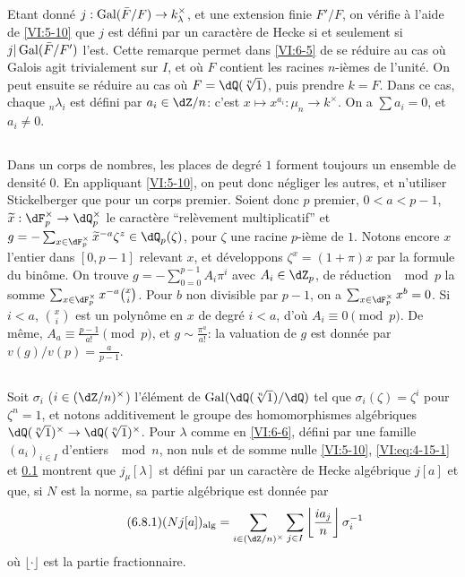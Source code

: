 Etant donné $j:\operatorname{Gal}(\bar F/F) \to k_\lambda^\times$, et une extension finie 
$F'/F$, on vérifie à l'aide de \ref{VI:5-10} que $j$ est défini par un 
caractère de Hecke si et seulement si $j|\operatorname{Gal}(\bar F/F')$ l'est. Cette 
remarque permet dans \ref{VI:6-5} de se réduire au cas où Galois agit 
trivialement sur $I$, et où $F$ contient les racines $n$-ièmes de 
l'unité. On peut ensuite se réduire au cas où $F=\dQ(\sqrt[n]{1})$, puis 
prendre $k=F$. Dans ce cas, chaque $_n \lambda_i$ est défini par 
$a_i\in \dZ/n$: c'est $x\mapsto x^{a_i}:\mu_n \to k^\times$. On a 
$\sum a_i=0$, et $a_i\ne 0$. 





\subsection{}\label{VI:6-7}

Dans un corps de nombres, les places de degré $1$ forment toujours un 
ensemble de densité $0$. En appliquant \ref{VI:5-10}, on peut donc négliger 
les autres, et n'utiliser Stickelberger que pour un corps premier. Soient donc 
$p$ premier, $0<a<p-1$, $\widetilde x:\dF_p^\times \to \dQ_p^\times$ le 
caractère ``relèvement multiplicatif'' et 
$g=-\sum_{x\in \dF_p^\times} \widetilde x^{-a} \zeta^z\in \dQ_p(\zeta)$, pour 
$\zeta$ une racine $p$-ième de $1$. Notons encore $x$ l'entier dans $[0,p-1]$ 
relevant $x$, et développons $\zeta^x=(1+\pi)x$ par la formule du binôme. 
On trouve $g=-\sum_{0=0}^{p-1} A_i\pi^i$ avec $A_i\in \dZ_p$, de réduction 
$\mod p$ la somme $\sum_{x\in \dF_p^\times} x^{-a} \binom x i$. Pour $b$ non 
divisible par $p-1$, on a $\sum_{x\in \dF_p^\times} x^b=0$. Si $i<a$, 
$\binom x i$ est un polynôme en $x$ de degré $i<a$, d'où 
$A_i\equiv 0\pmod p$. De même, $A_a\equiv \frac{p-1}{a!} \pmod p$, et 
$g\sim \frac{\pi^a}{a!}$: la valuation de $g$ est donnée par 
$v(g)/v(p) = \frac{a}{p-1}$. 





\subsection{}\label{VI:6-8}

Soit $\sigma_i$ ($i\in (\dZ/n)^\times$) l'élément de 
$\gal(\dQ(\sqrt[n]{1})/\dQ)$ tel que $\sigma_i(\zeta)=\zeta^i$ pour $\zeta^n=1$, 
et notons additivement le groupe des homomorphismes algébriques 
$\dQ(\sqrt[n]{1})^\times \to \dQ(\sqrt[n]{1})^\times$. Pour $\lambda$ comme en 
\ref{VI:6-6}, défini par une famille $(a_i)_{i\in I}$ d'entiers $\mod n$, non 
nuls et de somme nulle \ref{VI:5-10}, \eqref{VI:eq:4-15-1} et \ref{VI:6-7} 
montrent que $j_\mu[\lambda]$ st défini par un caractère de Hecke 
algébrique $j[a]$ et que, si $N$ est la norme, sa partie algébrique est 
donnée par 
\begin{equation*}\tag{6.8.1}\label{VI:eq:6-8-1}
  (N j[a])_\text{alg} = \sum_{i\in (\dZ/n)^\times} \sum_{j\in I} \left \lfloor \frac{i a_j}{n} \right\rfloor \sigma_i^{-1} 
\end{equation*}
où $\lfloor \cdot \rfloor$ est la partie fractionnaire. 





